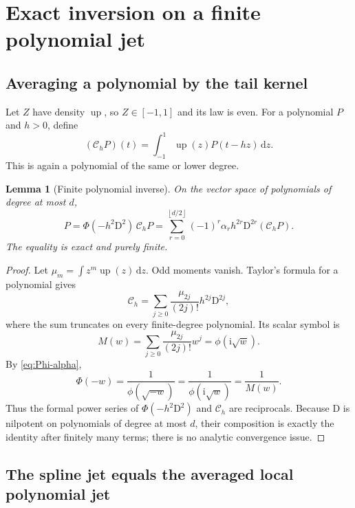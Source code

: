 \documentclass[11pt]{article}
\newtheorem{lemma}[lemma]{Lemma}
\theoremstyle{definition}
\theoremstyle{remark}
\newcommand{\dd}{\,\mathrm d}
\newcommand{\rv}{\operatorname{up}}
\newcommand{\D}{\mathrm D}
\newcommand{\floor}[1]{\left\lfloor #1\right\rfloor}
\newcommand{\ii}{\mathrm i}
\begin{document}
\section{Exact inversion on a finite polynomial jet}

\subsection{Averaging a polynomial by the tail kernel}

Let \(Z\) have density \(\rv\), so \(Z\in[-1,1]\) and its law is even.  For a
polynomial \(P\) and \(h>0\), define
\begin{equation}
 (\mathcal C_hP)(t)=\int_{-1}^{1}\rv(z)P(t-hz)\dd z.
 \label{eq:Ch}
\end{equation}
This is again a polynomial of the same or lower degree.

\begin{lemma}[Finite polynomial inverse]
\label{lem:polynomial-inverse}
On the vector space of polynomials of degree at most \(d\),
\begin{equation}
 \boxed{
 P=\Phi(-h^2\D^2)\,\mathcal C_hP
 =\sum_{r=0}^{\floor{d/2}}(-1)^r\alpha_rh^{2r}
   \D^{2r}(\mathcal C_hP).}
 \label{eq:polynomial-inverse}
\end{equation}
The equality is exact and purely finite.
\end{lemma}

\begin{proof}
Let \(\mu_m=\int z^m\rv(z)\dd z\).  Odd moments vanish.  Taylor's formula for
a polynomial gives
\begin{equation}
 \mathcal C_h
 =\sum_{j\ge0}\frac{\mu_{2j}}{(2j)!}h^{2j}\D^{2j},
 \label{eq:Ch-moment}
\end{equation}
where the sum truncates on every finite-degree polynomial.  Its scalar symbol
is
\[
 M(w)=\sum_{j\ge0}\frac{\mu_{2j}}{(2j)!}w^j
     =\phi(\ii\sqrt w).
\]
By \cref{eq:Phi-alpha},
\[
 \Phi(-w)=\frac{1}{\phi(\sqrt{-w})}
         =\frac{1}{\phi(\ii\sqrt w)}
         =\frac1{M(w)}.
\]
Thus the formal power series of \(\Phi(-h^2\D^2)\) and \(\mathcal C_h\) are
reciprocals.  Because \(\D\) is nilpotent on polynomials of degree at most
\(d\), their composition is exactly the identity after finitely many terms;
there is no analytic convergence issue.
\end{proof}

\subsection{The spline jet equals the averaged local polynomial jet}
\end{document}
